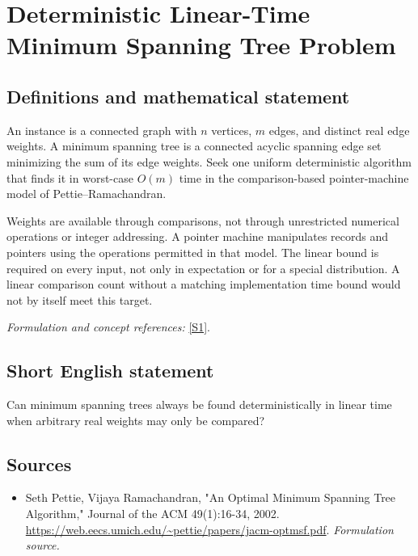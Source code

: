 \documentclass[11pt]{article}
\begin{document}
\section*{\texorpdfstring{Deterministic Linear-Time Minimum Spanning Tree Problem}{Deterministic Linear-Time Minimum Spanning Tree Problem}}\label{30006933}
\subsection{Definitions and mathematical statement}
An instance is a connected graph with $n$ vertices, $m$ edges, and distinct real edge weights. A minimum spanning tree is a connected acyclic spanning edge set minimizing the sum of its edge weights. Seek one uniform deterministic algorithm that finds it in worst-case $O(m)$ time in the comparison-based pointer-machine model of Pettie--Ramachandran.

Weights are available through comparisons, not through unrestricted numerical operations or integer addressing. A pointer machine manipulates records and pointers using the operations permitted in that model. The linear bound is required on every input, not only in expectation or for a special distribution. A linear comparison count without a matching implementation time bound would not by itself meet this target.
\par\smallskip\textit{Formulation and concept references:} \href{https://web.eecs.umich.edu/~pettie/papers/jacm-optmsf.pdf}{[S1]}.

\subsection{Short English statement}
Can minimum spanning trees always be found deterministically in linear time when arbitrary real weights may only be compared?
\subsection{Sources}
\begin{itemize}
\item[S1]Seth Pettie, Vijaya Ramachandran, "An Optimal Minimum Spanning Tree Algorithm," Journal of the ACM 49(1):16-34, 2002.
\url{https://web.eecs.umich.edu/~pettie/papers/jacm-optmsf.pdf}.
\textit{Formulation source.}
\end{itemize}
\end{document}
